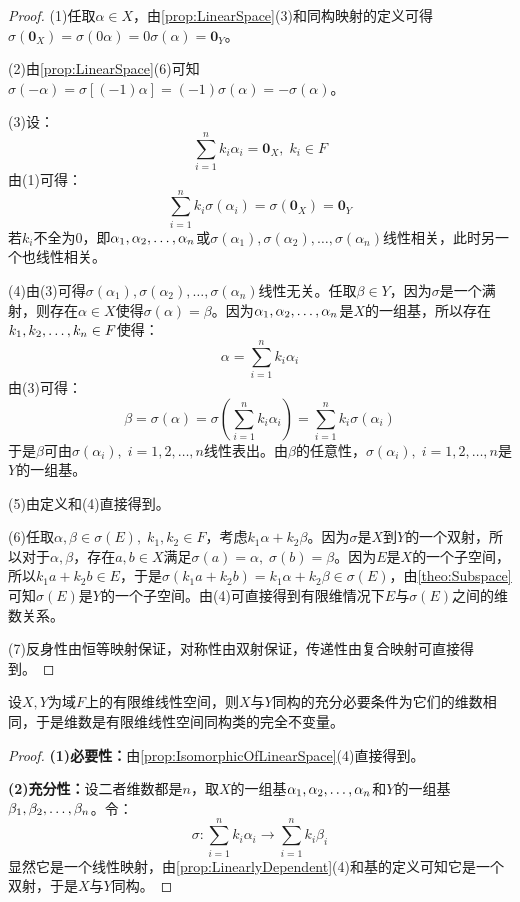 \begin{proof}
	(1)任取$\alpha\in X$，由\cref{prop:LinearSpace}(3)和同构映射的定义可得$\sigma(\mathbf{0}_X)=\sigma(0\alpha)=0\sigma(\alpha)=\mathbf{0}_Y$。\par
	(2)由\cref{prop:LinearSpace}(6)可知$\sigma(-\alpha)=\sigma[(-1)\alpha]=(-1)\sigma(\alpha)=-\sigma(\alpha)$。\par
	(3)设：
	\begin{equation*}
		\sum_{i=1}^{n}k_i\alpha_i=\mathbf{0}_X,\;k_i\in F
	\end{equation*}
	由(1)可得：
	\begin{equation*}
		\sum_{i=1}^{n}k_i\sigma(\alpha_i)=\sigma(\mathbf{0}_X)=\mathbf{0}_Y
	\end{equation*}
	若$k_i$不全为$0$，即$\alpha_1, \alpha_2, \dots, \alpha_{n}$或$\sigma(\alpha_1),\sigma(\alpha_2),\dots,\sigma(\alpha_n)$线性相关，此时另一个也线性相关。\par
	(4)由(3)可得$\sigma(\alpha_1),\sigma(\alpha_2),\dots,\sigma(\alpha_n)$线性无关。任取$\beta\in Y$，因为$\sigma$是一个满射，则存在$\alpha\in X$使得$\sigma(\alpha)=\beta$。因为$\alpha_1, \alpha_2, \dots, \alpha_{n}$是$X$的一组基，所以存在$k_1, k_2, \dots, k_{n}\in F$使得：
	\begin{equation*}
		\alpha=\sum_{i=1}^{n}k_i\alpha_i
	\end{equation*}
	由(3)可得：
	\begin{equation*}
		\beta=\sigma(\alpha)=\sigma\left(\sum_{i=1}^{n}k_i\alpha_i\right)=\sum_{i=1}^{n}k_i\sigma(\alpha_i)
	\end{equation*}
	于是$\beta$可由$\sigma(\alpha_i),\;i=1,2,\dots,n$线性表出。由$\beta$的任意性，$\sigma(\alpha_i),\;i=1,2,\dots,n$是$Y$的一组基。\par
	(5)由定义和(4)直接得到。\par
	(6)任取$\alpha,\beta\in\sigma(E),\;k_1,k_2\in F$，考虑$k_1\alpha+k_2\beta$。因为$\sigma$是$X$到$Y$的一个双射，所以对于$\alpha,\beta$，存在$a,b\in X$满足$\sigma(a)=\alpha,\;\sigma(b)=\beta$。因为$E$是$X$的一个子空间，所以$k_1a+k_2b\in E$，于是$\sigma(k_1a+k_2b)=k_1\alpha+k_2\beta\in\sigma(E)$，由\cref{theo:Subspace}可知$\sigma(E)$是$Y$的一个子空间。由(4)可直接得到有限维情况下$E$与$\sigma(E)$之间的维数关系。\par
	(7)反身性由恒等映射保证，对称性由双射保证，传递性由复合映射可直接得到。
\end{proof}
\begin{theorem}\label{theo:IsomorphicDim}
	设$X,Y$为域$F$上的有限维线性空间，则$X$与$Y$同构的充分必要条件为它们的维数相同，于是维数是有限维线性空间同构类的完全不变量。
\end{theorem}
\begin{proof}
	\textbf{(1)必要性：}由\cref{prop:IsomorphicOfLinearSpace}(4)直接得到。\par
	\textbf{(2)充分性：}设二者维数都是$n$，取$X$的一组基$\alpha_1, \alpha_2, \dots, \alpha_{n}$和$Y$的一组基$\beta_1, \beta_2, \dots, \beta_{n}$。令：
	\begin{equation*}
		\sigma:\sum_{i=1}^{n}k_i\alpha_i\longrightarrow\sum_{i=1}^{n}k_i\beta_i
	\end{equation*}
	显然它是一个线性映射，由\cref{prop:LinearlyDependent}(4)和基的定义可知它是一个双射，于是$X$与$Y$同构。
\end{proof}

